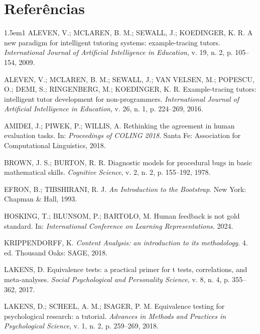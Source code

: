 \documentclass[11pt,a4paper]{article}
\begin{document}
\section*{Referências}
\begingroup\raggedright{}
\begin{hangparas}{1.5em}{1}
ALEVEN, V.; MCLAREN, B. M.; SEWALL, J.; KOEDINGER, K. R. A new paradigm for intelligent tutoring systems: example-tracing tutors. \emph{International Journal of Artificial Intelligence in Education}, v. 19, n. 2, p. 105--154, 2009.\par

ALEVEN, V.; MCLAREN, B. M.; SEWALL, J.; VAN VELSEN, M.; POPESCU, O.; DEMI, S.; RINGENBERG, M.; KOEDINGER, K. R. Example-tracing tutors: intelligent tutor development for non-programmers. \emph{International Journal of Artificial Intelligence in Education}, v. 26, n. 1, p. 224--269, 2016.\par

AMIDEI, J.; PIWEK, P.; WILLIS, A. Rethinking the agreement in human evaluation tasks. In: \emph{Proceedings of COLING 2018}. Santa Fe: Association for Computational Linguistics, 2018.\par

BROWN, J. S.; BURTON, R. R. Diagnostic models for procedural bugs in basic mathematical skills. \emph{Cognitive Science}, v. 2, n. 2, p. 155--192, 1978.\par

EFRON, B.; TIBSHIRANI, R. J. \emph{An Introduction to the Bootstrap}. New York: Chapman \& Hall, 1993.\par

HOSKING, T.; BLUNSOM, P.; BARTOLO, M. Human feedback is not gold standard. In: \emph{International Conference on Learning Representations}. 2024.\par

KRIPPENDORFF, K. \emph{Content Analysis: an introduction to its methodology}. 4. ed. Thousand Oaks: SAGE, 2018.\par

LAKENS, D. Equivalence tests: a practical primer for t tests, correlations, and meta-analyses. \emph{Social Psychological and Personality Science}, v. 8, n. 4, p. 355--362, 2017.\par

LAKENS, D.; SCHEEL, A. M.; ISAGER, P. M. Equivalence testing for psychological research: a tutorial. \emph{Advances in Methods and Practices in Psychological Science}, v. 1, n. 2, p. 259--269, 2018.\par


\end{hangparas}
\end{document}
